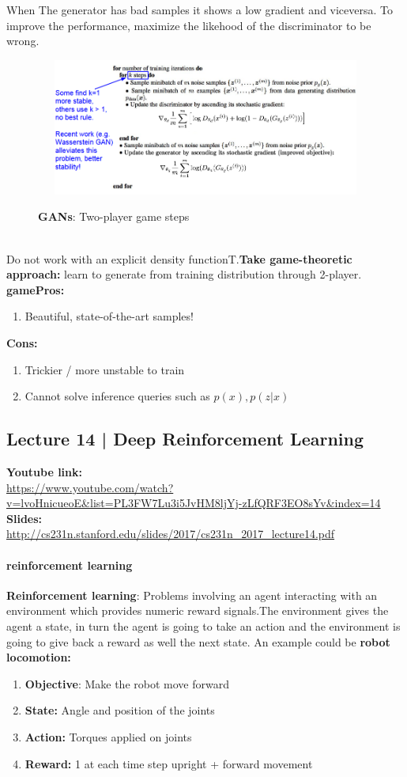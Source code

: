 \documentclass[11pt]{article}
\begin{document}
When The generator has bad samples it shows a low gradient  and viceversa. To improve the performance, maximize the likehood of the discriminator to be wrong.
\begin{figure}[h]
\centering
\captionsetup{justification=centering}
\includegraphics[width=13cm,height=4.5cm]{L1226.pdf}
\label{fig:L1226}
\caption{ \textbf{GANs}: Two-player game steps}
\end{figure}\\
Do not work with an explicit density functionT.\textbf{Take game-theoretic approach:} learn to generate from training distribution through 2-player.\\
\textbf{gamePros:}
\begin{enumerate}
    \item Beautiful, state-of-the-art samples!
\end{enumerate}{}
\textbf{Cons:}
\begin{enumerate}
\item Trickier / more unstable to train
\item Cannot solve inference queries such as $p(x), p(z|x)$
\end{enumerate}

\clearpage
\subsection{Lecture 14 | Deep Reinforcement Learning}
\textbf{Youtube link:}\\
\url{https://www.youtube.com/watch?v=lvoHnicueoE&list=PL3FW7Lu3i5JvHM8ljYj-zLfQRF3EO8sYv&index=14}\\
\textbf{Slides:}\\
\url{http://cs231n.stanford.edu/slides/2017/cs231n_2017_lecture14.pdf}
\paragraph{reinforcement learning}
\textbf{Reinforcement learning}: Problems involving an agent interacting with an environment which provides numeric reward signals.The environment gives the agent a state, in turn the agent is going to take an action and the environment is going to give back a reward as well the next state.
An example could be \textbf{robot locomotion:}
\begin{enumerate}
    \item \textbf{Objective}: Make the robot move forward
    \item \textbf{State: } Angle and position of the joints
    \item \textbf{Action:} Torques applied on joints
    \item \textbf{Reward:} 1 at each time step upright + forward movement
\end{enumerate}{}
\end{document}
